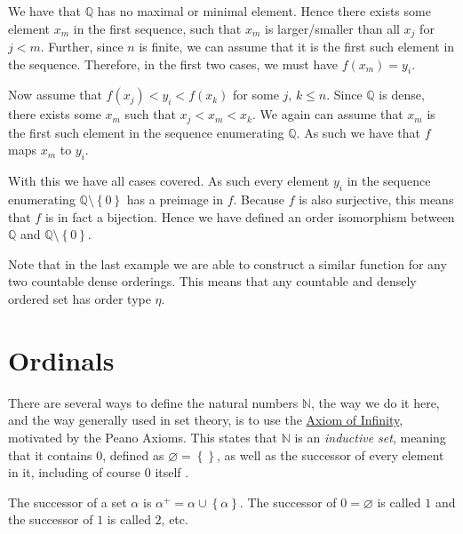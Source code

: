 \documentclass[../../main.tex]{subfiles}
\begin{document}
\begin{example}
    We have that $\mathbb{Q}$ has no maximal or minimal element.
    Hence there exists some element $x_m$ in the first sequence, such that $x_m$ is larger/smaller than all $x_j$ for $j < m$.
    Further, since $n$ is finite, we can assume that it is the first such element in the sequence.
    Therefore, in the first two cases, we must have $f(x_m) = y_i$.

    Now assume that $f(x_j) < y_i < f(x_k)$ for some $j,\, k \leq n$.
    Since $\mathbb{Q}$ is dense, there exists some $x_m$ such that $x_j < x_m < x_k$.
    We again can assume that $x_m$ is the first such element in the sequence enumerating $\mathbb{Q}$.
    As such we have that $f$ maps $x_m$ to $y_i$.

    With this we have all cases covered.
    As such every element $y_i$ in the sequence enumerating $\mathbb{Q} \setminus \left\{0\right\}$ has a preimage in $f$.
    Because $f$ is also surjective, this means that $f$ is in fact a bijection.
    Hence we have defined an order isomorphism between $\mathbb{Q}$ and $\mathbb{Q} \setminus \left\{0\right\}$.
\end{example}

Note that in the last example we are able to construct a similar function for any two countable dense orderings.
This means that any countable and densely ordered set has order type $\eta$.

% 

\section{Ordinals}\label{ordinals-section}
There are several ways to define the natural numbers $\mathbb{N}$, the way we do it here, and the way generally used in set theory, is to use the \hyperref[ZF7]{Axiom of Infinity}, motivated by the Peano Axioms.
This states that $\mathbb{N}$ is an \textit{inductive set}, meaning that it contains $0$, defined as $\varnothing = \left\{\right\}$, as well as the successor of every element in it, including of course $0$ itself \cite[p.39]{Gol17}.

\begin{definition}\cite[p.38]{Gol17}
    The successor of a set $\alpha$ is $\alpha^+ = \alpha \cup \left\{\alpha\right\}$.
    The successor of $0 = \varnothing$ is called $1$ and the successor of $1$ is called $2$, etc.
\end{definition}
\end{document}
